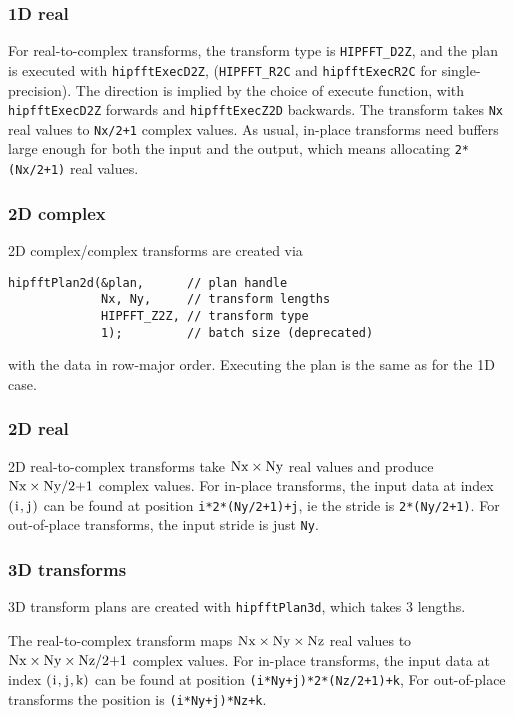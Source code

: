 \documentclass[10pt]{article}
\renewcommand{\(}{\left(}
\renewcommand{\)}{\right)}
\begin{document}
\subsubsection{1D real}

For real-to-complex transforms, the transform type is
\lstinline{HIPFFT_D2Z}, and the plan is executed with
\lstinline{hipfftExecD2Z}, (\lstinline{HIPFFT_R2C} and
\lstinline{hipfftExecR2C} for single-precision).  The direction is
implied by the choice of execute function, with
\lstinline{hipfftExecD2Z} forwards and \lstinline{hipfftExecZ2D}
backwards.  The transform takes \lstinline{Nx} real values to
\lstinline{Nx/2+1} complex values.  As usual, in-place transforms need
buffers large enough for both the input and the output, which means
allocating \lstinline{2*(Nx/2+1)} real values.

\subsubsection{2D complex}
2D complex/complex transforms are created via
\begin{lstlisting}
hipfftPlan2d(&plan,      // plan handle
             Nx, Ny,     // transform lengths
             HIPFFT_Z2Z, // transform type 
             1);         // batch size (deprecated)
\end{lstlisting}
with the data in row-major order.  Executing the plan is the same as
for the 1D case.

\subsubsection{2D real}
2D real-to-complex transforms take
$\text{\lstinline{Nx}}\times{}\text{\lstinline{Ny}}$ real values and
produce $\text{\lstinline{Nx}}\times{}\text{\lstinline{Ny/2+1}}$
complex values.  For in-place transforms, the input data at index
$\(\text{\lstinline{i}},\text{\lstinline{j}}\)$ can be found at
position \lstinline{i*2*(Ny/2+1)+j}, ie the stride is
\lstinline{2*(Ny/2+1)}.  For out-of-place transforms, the input stride
is just \lstinline{Ny}.

\subsubsection{3D transforms}
3D transform plans are created with \lstinline{hipfftPlan3d}, which
takes 3 lengths.

The real-to-complex transform maps
$\text{\lstinline{Nx}}\times{}\text{\lstinline{Ny}}\times{}\text{\lstinline{Nz}}$
real values to
$\text{\lstinline{Nx}}\times{}\text{\lstinline{Ny}}\times{}\text{\lstinline{Nz/2+1}}$
complex values.  For in-place transforms, the input data at index
$\(\text{\lstinline{i}},\text{\lstinline{j}},\text{\lstinline{k}}\)$
can be found at position \lstinline{(i*Ny+j)*2*(Nz/2+1)+k}, For
out-of-place transforms the position is \lstinline{(i*Ny+j)*Nz+k}.
\end{document}
